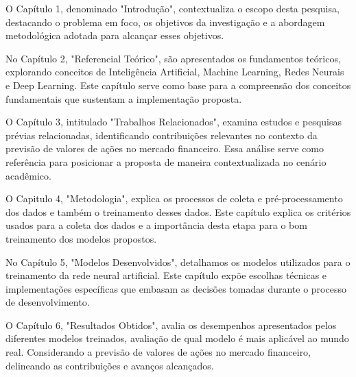 O Capítulo 1, denominado "Introdução", contextualiza o escopo desta pesquisa, destacando o problema em foco, os objetivos da investigação e a abordagem metodológica adotada para alcançar esses objetivos.

No Capítulo 2, "Referencial Teórico", são apresentados os fundamentos teóricos, explorando conceitos de Inteligência Artificial, Machine Learning, Redes Neurais e Deep Learning. Este capítulo serve como base para a compreensão dos conceitos fundamentais que sustentam a implementação proposta.

O Capítulo 3, intitulado "Trabalhos Relacionados", examina estudos e pesquisas prévias relacionadas, identificando contribuições relevantes no contexto da previsão de valores de ações no mercado financeiro. Essa análise serve como referência para posicionar a proposta de maneira contextualizada no cenário acadêmico.

O Capitulo 4, "Metodologia", explica os processos de coleta e pré-processamento dos dados e também o treinamento desses dados. Este capítulo explica os critérios usados para a coleta dos dados e a importância desta etapa para o bom treinamento dos modelos propostos. 

No Capítulo 5, "Modelos Desenvolvidos", detalhamos os modelos utilizados para o treinamento da rede neural artificial. Este capítulo expõe escolhas técnicas e implementações específicas que embasam as decisões tomadas durante o processo de desenvolvimento.

O Capítulo 6, "Resultados Obtidos", avalia os desempenhos apresentados pelos diferentes modelos treinados, avaliação de qual modelo é mais aplicável ao mundo real. Considerando a previsão de valores de ações no mercado financeiro, delineando as contribuições e avanços alcançados.